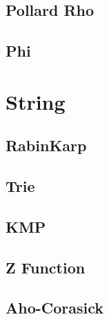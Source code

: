 \subsection{Pollard Rho}
\raggedbottom
\hrulefill
\subsection{Phi}
\raggedbottom
\hrulefill

\section{String}
\subsection{RabinKarp}
\raggedbottom
\hrulefill
\subsection{Trie}
\raggedbottom
\hrulefill
\subsection{KMP}
\raggedbottom
\hrulefill
\subsection{Z Function}
\raggedbottom
\hrulefill
\subsection{Aho-Corasick}
\raggedbottom
\hrulefill

